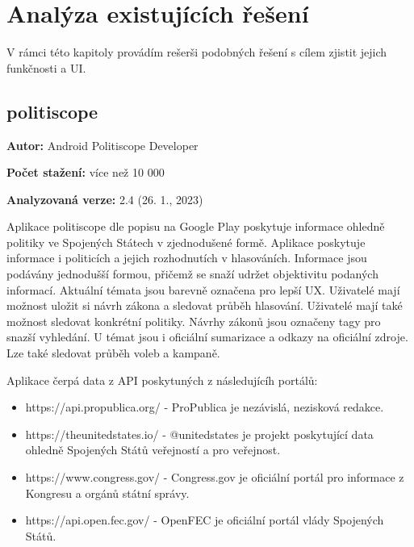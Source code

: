 \chapter{Analýza existujících řešení}

\setcounter{page}{1}

\begin{chapterabstract}
V rámci této kapitoly provádím rešerši podobných řešení s cílem zjistit jejich funkčnosti a UI.
\end{chapterabstract}

\section{politiscope}

\begin{description}
	\item \textbf{Autor:} Android Politiscope Developer
	\item \textbf{Počet stažení:} více než 10 000
	\item \textbf{Analyzovaná verze:} 2.4 (26. 1., 2023)
\end{description}

Aplikace politiscope \cite{politiscope} dle popisu na Google Play poskytuje informace ohledně politiky ve Spojených Státech v zjednodušené formě. Aplikace poskytuje informace i politicích a jejich rozhodnutích v hlasováních. Informace jsou podávány jednodušší formou, přičemž se snaží udržet objektivitu podaných informací. Aktuální témata jsou barevně označena pro lepší UX. Uživatelé mají možnost uložit si návrh zákona a sledovat průběh hlasování. Uživatelé mají také možnost sledovat konkrétní politiky. Návrhy zákonů jsou označeny tagy pro snazší vyhledání. U témat jsou i oficiální sumarizace a odkazy na oficiální zdroje. Lze také sledovat průběh voleb a kampaně.

Aplikace čerpá data z API poskytuných z následujícíh portálů:

\begin{itemize}
	\item https://api.propublica.org/ - ProPublica je nezávislá, nezisková redakce. \cite{propublica}
	\item https://theunitedstates.io/ - @unitedstates je projekt poskytující data ohledně Spojených Států veřejností a pro veřejnost. \cite{unitedstates}
	\item https://www.congress.gov/ - Congress.gov je oficiální portál pro informace z Kongresu a orgánů státní správy. \cite{congress}
	\item https://api.open.fec.gov/ - OpenFEC je oficiální portál vlády Spojených Států. \cite{openfec}
\end{itemize}

